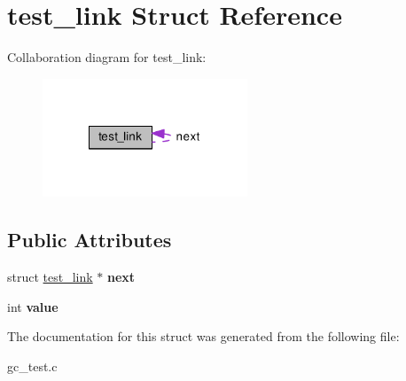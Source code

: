 \hypertarget{structtest__link}{\section{test\-\_\-link Struct Reference}
\label{structtest__link}
}


Collaboration diagram for test\-\_\-link\-:\nopagebreak
\begin{figure}[H]
\begin{center}
\leavevmode
\includegraphics[width=173pt]{structtest__link__coll__graph}
\end{center}
\end{figure}
\subsection*{Public Attributes}
\begin{DoxyCompactItemize}
\item 
\hypertarget{structtest__link_a41da4adc6005519765311723cdd67e4b}{struct \hyperlink{structtest__link}{test\-\_\-link} $\ast$ {\bfseries next}}\label{structtest__link_a41da4adc6005519765311723cdd67e4b}

\item 
\hypertarget{structtest__link_ac632e3031e6095186684a51fa11ab899}{int {\bfseries value}}\label{structtest__link_ac632e3031e6095186684a51fa11ab899}

\end{DoxyCompactItemize}


The documentation for this struct was generated from the following file\-:\begin{DoxyCompactItemize}
\item 
gc\-\_\-test.\-c\end{DoxyCompactItemize}
